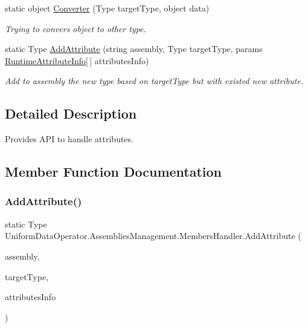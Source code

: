 \begin{DoxyCompactItemize}
static object \mbox{\hyperlink{class_uniform_data_operator_1_1_assemblies_management_1_1_members_handler_a0401f2325dda95a28dea4129e62bc9fd}{Converter}} (Type target\+Type, object data)
\begin{DoxyCompactList}\small\item\em Trying to convers object to other type. \end{DoxyCompactList}\item 
static Type \mbox{\hyperlink{class_uniform_data_operator_1_1_assemblies_management_1_1_members_handler_a66f0295fa016e2d296046fd968103a4e}{Add\+Attribute}} (string assembly, Type target\+Type, params \mbox{\hyperlink{struct_uniform_data_operator_1_1_assemblies_management_1_1_members_handler_1_1_runtime_attribute_info}{Runtime\+Attribute\+Info}}\mbox{[}$\,$\mbox{]} attributes\+Info)
\begin{DoxyCompactList}\small\item\em Add to assembly the new type based on target\+Type but with existed new attribute. \end{DoxyCompactList}\end{DoxyCompactItemize}


\subsection{Detailed Description}
Provides A\+PI to handle attributes. 



\subsection{Member Function Documentation}
\mbox{\label{class_uniform_data_operator_1_1_assemblies_management_1_1_members_handler_a66f0295fa016e2d296046fd968103a4e}} 
\subsubsection{\texorpdfstring{Add\+Attribute()}{AddAttribute()}}
{\footnotesize\ttfamily static Type Uniform\+Data\+Operator.\+Assemblies\+Management.\+Members\+Handler.\+Add\+Attribute (\begin{DoxyParamCaption}\item[{string}]{assembly,  }\item[{Type}]{target\+Type,  }\item[{params \mbox{\hyperlink{struct_uniform_data_operator_1_1_assemblies_management_1_1_members_handler_1_1_runtime_attribute_info}{Runtime\+Attribute\+Info}} \mbox{[}$\,$\mbox{]}}]{attributes\+Info }\end{DoxyParamCaption})\hspace{0.3cm}{\ttfamily [static]}}



